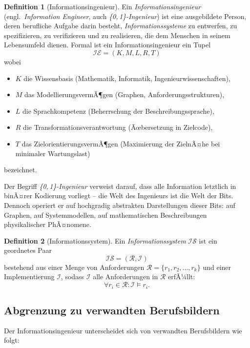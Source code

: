 ﻿\documentclass[a4paper,12pt]{article}
\theoremstyle{definition}
\newtheorem{definition}{Definition}
\begin{document}
\begin{definition}[Informationsingenieur]
\label{def:infeng}
Ein \emph{Informationsingenieur} (engl.\ \emph{Information Engineer}, auch
\emph{\{0,\,1\}-Ingenieur}) ist eine ausgebildete Person, deren berufliche Aufgabe darin
besteht, \emph{Informationssysteme} zu entwerfen, zu spezifizieren, zu verifizieren und zu
realisieren, die dem Menschen in seinem Lebensumfeld dienen.
Formal ist ein Informationsingenieur ein Tupel
\[
  \mathcal{IE} = (K, M, L, R, T)
\]
wobei
\begin{itemize}
  \item $K$ die Wissensbasis (Mathematik, Informatik, Ingenieurwissenschaften),
  \item $M$ das ModellierungsvermÃ¶gen (Graphen, Anforderungsstrukturen),
  \item $L$ die Sprachkompetenz (Beherrschung der Beschreibungssprache),
  \item $R$ die Transformationsverantwortung (Ãœbersetzung in Zielcode),
  \item $T$ das ZielorientierungsvermÃ¶gen (Maximierung der ZielnÃ¤he bei minimaler Wartungslast)
\end{itemize}
bezeichnet.
\end{definition}

Der Begriff \emph{\{0,\,1\}-Ingenieur} verweist darauf, dass alle Information letztlich in
binÃ¤rer Kodierung vorliegt -- die Welt des Ingenieurs ist die Welt der Bits. Dennoch operiert
er auf hochgradig abstrakten Darstellungen dieser Bits: auf Graphen, auf Systemmodellen, auf
mathematischen Beschreibungen physikalischer PhÃ¤nomene.

\begin{definition}[Informationssystem]
\label{def:infosys}
Ein \emph{Informationssystem} $\mathcal{IS}$ ist ein geordnetes Paar
\[
  \mathcal{IS} = (\mathcal{R}, \mathcal{I})
\]
bestehend aus einer Menge von Anforderungen $\mathcal{R} = \{r_1, r_2, \ldots, r_k\}$ und
einer Implementierung $\mathcal{I}$, sodass $\mathcal{I}$ alle Anforderungen in $\mathcal{R}$
erfÃ¼llt:
\[
  \forall r_i \in \mathcal{R}: \mathcal{I} \models r_i.
\]
\end{definition}

\subsection{Abgrenzung zu verwandten Berufsbildern}

Der Informationsingenieur unterscheidet sich von verwandten Berufsbildern wie folgt:
\end{document}

